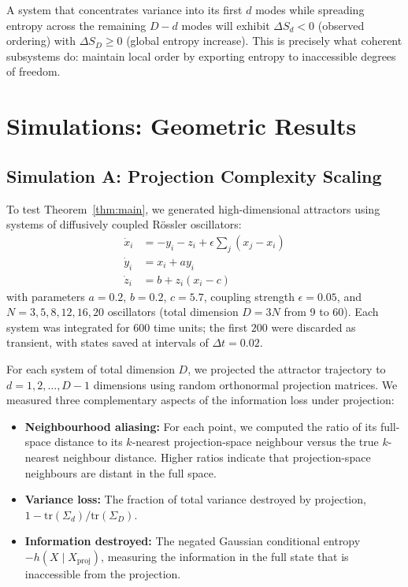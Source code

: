 \documentclass[12pt,a4paper]{article}
\begin{document}
A system that concentrates variance into its first $d$ modes while spreading entropy across the remaining $D-d$ modes will exhibit $\Delta S_d < 0$ (observed ordering) with $\Delta S_D \geq 0$ (global entropy increase).
This is precisely what coherent subsystems do: maintain local order by exporting entropy to inaccessible degrees of freedom.



\section{Simulations: Geometric Results}
\label{sec:sim_geom}

\subsection{Simulation A: Projection Complexity Scaling}

To test Theorem~\ref{thm:main}, we generated high-dimensional attractors using systems of diffusively coupled R\"ossler oscillators:
\begin{align}
\dot{x}_i &= -y_i - z_i + \epsilon \sum_{j} (x_j - x_i) \nonumber\\
\dot{y}_i &= x_i + a y_i \\
\dot{z}_i &= b + z_i(x_i - c) \nonumber
\end{align}
with parameters $a = 0.2$, $b = 0.2$, $c = 5.7$, coupling strength $\epsilon = 0.05$, and $N = 3, 5, 8, 12, 16, 20$ oscillators (total dimension $D = 3N$ from 9 to 60).
Each system was integrated for $600$ time units; the first $200$ were discarded as transient, with states saved at intervals of $\Delta t = 0.02$.

For each system of total dimension $D$, we projected the attractor trajectory to $d = 1, 2, \ldots, D-1$ dimensions using random orthonormal projection matrices.
We measured three complementary aspects of the information loss under projection:
\begin{itemize}
\item \textbf{Neighbourhood aliasing:} For each point, we computed the ratio of its full-space distance to its $k$-nearest projection-space neighbour versus the true $k$-nearest neighbour distance.
Higher ratios indicate that projection-space neighbours are distant in the full space.
\item \textbf{Variance loss:} The fraction of total variance destroyed by projection, $1 - \mathrm{tr}(\Sigma_d)/\mathrm{tr}(\Sigma_D)$.
\item \textbf{Information destroyed:} The negated Gaussian conditional entropy $-h(X \mid X_{\mathrm{proj}})$, measuring the information in the full state that is inaccessible from the projection.
\end{itemize}
\end{document}
